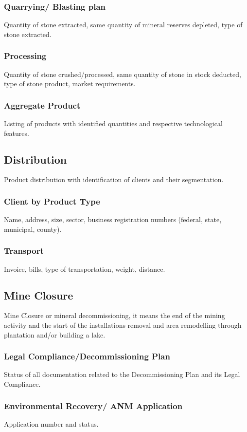 \subsubsection{Quarrying/ Blasting plan}\label{sec:Quarrying}
Quantity of stone extracted, same quantity of mineral reserves depleted, type of stone extracted.

\subsubsection{Processing}\label{sec:Processing}
Quantity of stone crushed/processed, same quantity of stone in stock deducted, type of stone product, market requirements.

\subsubsection{Aggregate Product}\label{sec:AggregateProduct}
Listing of products with identified quantities and respective technological features.

\subsection{Distribution}\label{sec:Distribution}
Product distribution with identification of clients and their segmentation. 

\subsubsection{Client by Product Type}\label{sec:Client}
Name, address, size, sector, business registration numbers (federal, state, municipal, county).

\subsubsection{Transport}\label{sec:Transport}
Invoice, bills, type of transportation, weight, distance.

\subsection{Mine Closure}\label{sec:MineClosure}
Mine Closure or mineral decommissioning, it means the end of the mining activity and the start of the installations removal and area remodelling through plantation and/or building a lake.

\subsubsection{Legal Compliance/Decommissioning Plan}\label{sec:LegalCompliance}
Status of all documentation related to the Decommissioning Plan and its Legal Compliance.

\subsubsection{Environmental Recovery/ ANM Application}\label{sec:EnvironmentalRecovery}
Application number and status.